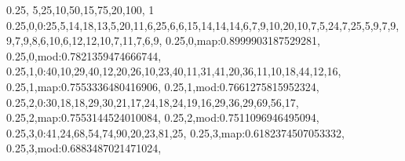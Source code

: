 0.25,
5,25,10,50,15,75,20,100,
1
0.25,0,0:25,5,14,18,13,5,20,11,6,25,6,6,15,14,14,14,6,7,9,10,20,10,7,5,24,7,25,5,9,7,9,9,7,9,8,6,10,6,12,12,10,7,11,7,6,9,
0.25,0,map:0.8999903187529281,
0.25,0,mod:0.7821359474666744,
0.25,1,0:40,10,29,40,12,20,26,10,23,40,11,31,41,20,36,11,10,18,44,12,16,
0.25,1,map:0.7553336480416906,
0.25,1,mod:0.7661275815952324,
0.25,2,0:30,18,18,29,30,21,17,24,18,24,19,16,29,36,29,69,56,17,
0.25,2,map:0.7553144524010084,
0.25,2,mod:0.7511096946495094,
0.25,3,0:41,24,68,54,74,90,20,23,81,25,
0.25,3,map:0.6182374507053332,
0.25,3,mod:0.6883487021471024,
